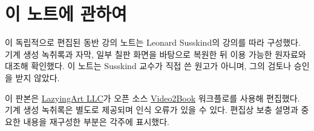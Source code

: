 \documentclass[11pt,oneside]{book}
\begin{document}
\frontmatter
\hypersetup{pageanchor=false}

\hypersetup{pageanchor=true}

\clearpage
\chapter{이 노트에 관하여}
이 독립적으로 편집된 동반 강의 노트는 Leonard Susskind의 강의를 따라 구성했다. 기계 생성 녹취록과 자막, 일부 칠판 화면을 바탕으로 복원한 뒤 이용 가능한 원자료와 대조해 확인했다. 이 노트는 Susskind 교수가 직접 쓴 원고가 아니며, 그의 검토나 승인을 받지 않았다.

이 판본은 \href{https://lazying.art}{LazyingArt LLC}가 오픈 소스 \href{https://github.com/lachlanchen/Video2Book}{Video2Book} 워크플로를 사용해 편집했다. 기계 생성 녹취록은 별도로 제공되며 인식 오류가 있을 수 있다. 편집상 보충 설명과 중요한 내용을 재구성한 부분은 각주에 표시했다.
\clearpage
\tableofcontents
\mainmatter








\end{document}
